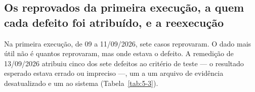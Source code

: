 
\subsection{Os reprovados da primeira execução, a quem cada defeito foi atribuído, e a reexecução}\label{sec:5-2-2}

Na primeira execução, de 09 a 11/09/2026, sete casos reprovaram. O dado mais útil não é quantos reprovaram, mas onde estava o defeito. A remedição de 13/09/2026 atribuiu cinco dos sete defeitos ao critério de teste --- o resultado esperado estava errado ou impreciso ---, um a um arquivo de evidência desatualizado e um ao sistema (Tabela~\ref{tab:5-3}).

